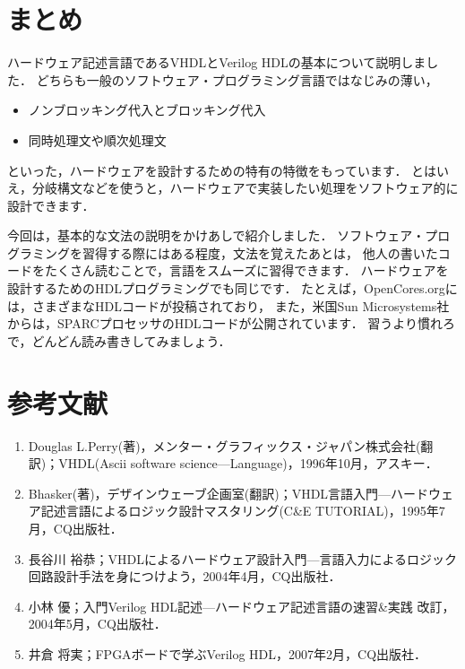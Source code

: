 \documentclass[a4paper,dvipdfmx]{jsarticle}
\begin{document}
\section{まとめ}
ハードウェア記述言語であるVHDLとVerilog HDLの基本について説明しました．
どちらも一般のソフトウェア・プログラミング言語ではなじみの薄い，
\begin{itemize}
 \item ノンブロッキング代入とブロッキング代入
 \item 同時処理文や順次処理文
\end{itemize}
といった，ハードウェアを設計するための特有の特徴をもっています．
とはいえ，分岐構文などを使うと，ハードウェアで実装したい処理をソフトウェア的に設計できます．

今回は，基本的な文法の説明をかけあしで紹介しました．
ソフトウェア・プログラミングを習得する際にはある程度，文法を覚えたあとは，
他人の書いたコードをたくさん読むことで，言語をスムーズに習得できます．
ハードウェアを設計するためのHDLプログラミングでも同じです．
たとえば，OpenCores.orgには，さまざまなHDLコードが投稿されており，
また，米国Sun Microsystems社からは，SPARCプロセッサのHDLコードが公開されています．
習うより慣れろで，どんどん読み書きしてみましょう．

\section*{参考文献}
\begin{enumerate}
 \item Douglas L.Perry(著)，メンター・グラフィックス・ジャパン株式会社(翻訳)；VHDL(Ascii software science—Language)，1996年10月，アスキー．
 \item Bhasker(著)，デザインウェーブ企画室(翻訳)；VHDL言語入門—ハードウェア記述言語によるロジック設計マスタリング(C\&E TUTORIAL)，1995年7月，CQ出版社．
 \item 長谷川 裕恭；VHDLによるハードウェア設計入門—言語入力によるロジック回路設計手法を身につけよう，2004年4月，CQ出版社．
 \item 小林 優；入門Verilog HDL記述—ハードウェア記述言語の速習\&実践 改訂，2004年5月，CQ出版社．
 \item 井倉 将実；FPGAボードで学ぶVerilog HDL，2007年2月，CQ出版社．
\end{enumerate}
\end{document}
